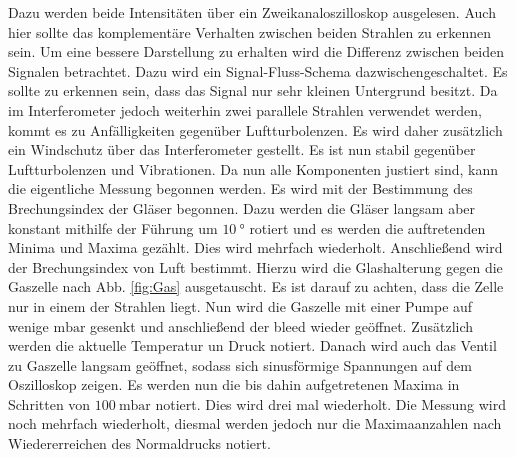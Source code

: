  Dazu werden beide Intensitäten über ein Zweikanaloszilloskop ausgelesen. Auch hier sollte das komplementäre Verhalten zwischen beiden Strahlen zu erkennen sein. Um eine bessere Darstellung zu erhalten wird die Differenz zwischen beiden Signalen betrachtet. Dazu wird ein Signal-Fluss-Schema dazwischengeschaltet. Es sollte zu erkennen sein, dass das Signal nur sehr kleinen Untergrund besitzt. Da im Interferometer jedoch weiterhin zwei parallele Strahlen verwendet werden, kommt es zu Anfälligkeiten gegenüber Luftturbolenzen. Es wird daher zusätzlich ein Windschutz über das Interferometer gestellt. Es ist nun stabil gegenüber Luftturbolenzen und Vibrationen. Da nun alle Komponenten justiert sind, kann die eigentliche Messung begonnen werden. Es wird mit der Bestimmung des Brechungsindex der Gläser begonnen. Dazu werden die Gläser langsam aber konstant mithilfe der Führung um $\SI{10}{\degree}$ rotiert und es werden die auftretenden Minima und Maxima gezählt. Dies wird mehrfach wiederholt. Anschließend wird der Brechungsindex von Luft bestimmt. Hierzu wird die Glashalterung gegen die Gaszelle  nach Abb. \ref{fig:Gas} ausgetauscht. Es ist darauf zu achten, dass die Zelle nur in einem der Strahlen liegt. Nun wird die Gaszelle mit einer Pumpe auf wenige $\si{\milli\bar}$ gesenkt und anschließend der bleed wieder geöffnet. Zusätzlich werden die aktuelle Temperatur un Druck notiert. Danach wird auch das Ventil zu Gaszelle langsam geöffnet, sodass sich sinusförmige Spannungen auf dem Oszilloskop zeigen. Es werden nun die bis dahin aufgetretenen Maxima in Schritten von $\SI{100}{\milli\bar}$ notiert. Dies wird drei mal wiederholt. Die Messung wird noch mehrfach wiederholt, diesmal werden jedoch nur die Maximaanzahlen nach Wiedererreichen des Normaldrucks notiert. 